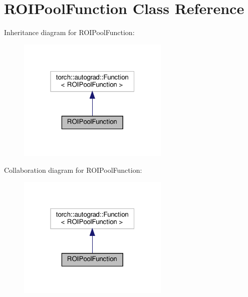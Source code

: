 \hypertarget{classROIPoolFunction}{}\section{R\+O\+I\+Pool\+Function Class Reference}
\label{classROIPoolFunction}


Inheritance diagram for R\+O\+I\+Pool\+Function\+:
\nopagebreak
\begin{figure}[H]
\begin{center}
\leavevmode
\includegraphics[width=205pt]{classROIPoolFunction__inherit__graph}
\end{center}
\end{figure}


Collaboration diagram for R\+O\+I\+Pool\+Function\+:
\nopagebreak
\begin{figure}[H]
\begin{center}
\leavevmode
\includegraphics[width=205pt]{classROIPoolFunction__coll__graph}
\end{center}
\end{figure}
